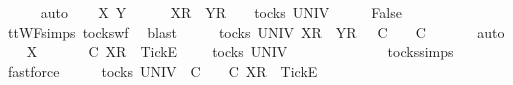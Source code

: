 \ \ \ \ \isamarkupfalse%
\ auto\isanewline
{}\isamarkupfalse%
\isanewline
\ \ \isamarkupfalse%
\ X\ Y\ {\isasymrho}\ {\isasymsigma}\isanewline
\ \ \isamarkupfalse%
\ {\isachardoublequoteopen}{\isacharbrackleft}X{\isacharbrackright}\isactrlsub R\ {\isacharhash}\ {\isacharbrackleft}Y{\isacharbrackright}\isactrlsub R\ {\isacharhash}\ {\isasymrho}\ {\isasymin}\ tocks\ UNIV{\isachardoublequoteclose}\isanewline
\ \ \isamarkupfalse%
\ \isamarkupfalse%
\ {\isachardoublequoteopen}False{\isachardoublequoteclose}\isanewline
\ \ \ \ \isamarkupfalse%
\ ttWF{\isachardot}simps{\isacharparenleft}{}{}{\isacharparenright}\ tocks{\isacharunderscore}wf\ \isamarkupfalse%
\ blast\isanewline
\ \ \isamarkupfalse%
\ \isamarkupfalse%
\ {\isachardoublequoteopen}{\isasymexists}{\isasymrho}{\isacharprime}{\isasymin}tocks\ UNIV{\isachardot}\ {\isacharbrackleft}X{\isacharbrackright}\isactrlsub R\ {\isacharhash}\ {\isacharbrackleft}Y{\isacharbrackright}\isactrlsub R\ {\isacharhash}\ {\isasymrho}\ {\isasymlesssim}\isactrlsub C\ {\isasymrho}{\isacharprime}\ {\isasymand}\ {\isasymrho}{\isacharprime}\ {\isasymle}\isactrlsub C\ {\isasymsigma}{\isachardoublequoteclose}\isanewline
\ \ \ \ \isamarkupfalse%
\ auto\isanewline
{}\isamarkupfalse%
\isanewline
\ \ \isamarkupfalse%
\ X\ {\isasymrho}\ {\isasymsigma}\isanewline
\ \ \isamarkupfalse%
\ {\isachardoublequoteopen}{\isasymrho}\ {\isasymlesssim}\isactrlsub C\ {\isacharbrackleft}X{\isacharbrackright}\isactrlsub R\ {\isacharhash}\ {\isacharbrackleft}Tick{\isacharbrackright}\isactrlsub E\ {\isacharhash}\ {\isasymsigma}{\isachardoublequoteclose}\ {\isachardoublequoteopen}{\isasymrho}\ {\isasymin}\ tocks\ UNIV{\isachardoublequoteclose}\isanewline
\ \ \isamarkupfalse%
\ \isamarkupfalse%
\ {\isachardoublequoteopen}{\isasymrho}\ {\isacharequal}\ {\isacharbrackleft}{\isacharbrackright}{\isachardoublequoteclose}\isanewline
\ \ \ \ \isamarkupfalse%
\ tocks{\isachardot}simps\ \isamarkupfalse%
\ fastforce\isanewline
\ \ \isamarkupfalse%
\ \isamarkupfalse%
\ {\isachardoublequoteopen}{\isasymexists}{\isasymrho}{\isacharprime}{\isasymin}tocks\ UNIV{\isachardot}\ {\isasymrho}\ {\isasymlesssim}\isactrlsub C\ {\isasymrho}{\isacharprime}\ {\isasymand}\ {\isasymrho}{\isacharprime}\ {\isasymle}\isactrlsub C\ {\isacharbrackleft}X{\isacharbrackright}\isactrlsub R\ {\isacharhash}\ {\isacharbrackleft}Tick{\isacharbrackright}\isactrlsub E\ {\isacharhash}\ {\isasymsigma}{\isachardoublequoteclose}\isanewline
